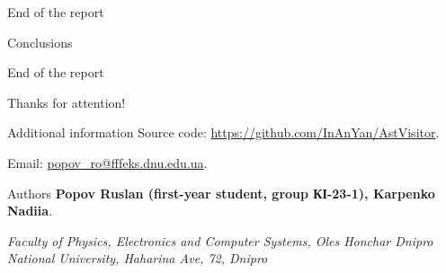 \documentclass{beamer}
\begin{document}
    \begin{frame}{End of the report}
        \begin{center}
            \huge Conclusions
        \end{center}
    \end{frame}

    \begin{frame}{End of the report}
        \begin{center}
            \huge Thanks for attention!
        \end{center}
        
        \begin{exampleblock}{Additional information}
            Source code: \textcolor{blue}{\href{https://github.com/InAnYan/AstVisitor}{https://github.com/InAnYan/AstVisitor}}.
            
            Email:  \textcolor{blue}{ \href{mailto:popov_ro@fffeks.dnu.edu.ua}{popov\_ro@fffeks.dnu.edu.ua}}.
        \end{exampleblock}
        
        \begin{block}{Authors}
            \textbf{Popov Ruslan (first-year student, group КІ-23-1), Karpenko Nadiia}.
            
            \textit{Faculty of Physics, Electronics and Computer Systems, Oles Honchar Dnipro National University, Haharina Ave, 72, Dnipro}
        \end{block}
    \end{frame}
\end{document}
